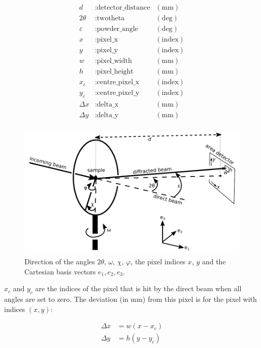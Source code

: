 \documentclass[a4paper, 12pt, twoside]{scrartcl}
\begin{document}
\begin{align*}
	d &: \text{detector\_distance} & (\mathrm{mm})\\
	2\theta &: \text{twotheta} & (\mathrm{deg})\\
	\varepsilon &: \text{powder\_angle} & (\mathrm{deg})\\
	x &: \text{pixel\_x} & (\mathrm{index})\\
	y &: \text{pixel\_y} & (\mathrm{index})\\
	w &: \text{pixel\_width} & (\mathrm{mm})\\
	h &: \text{pixel\_height} & (\mathrm{mm})\\
	x_c &: \text{centre\_pixel\_x} & (\mathrm{index})\\
	y_c &: \text{centre\_pixel\_y} & (\mathrm{index})\\
	\Delta x &: \text{delta\_x} & (\mathrm{mm})\\
	\Delta y &: \text{delta\_y} & (\mathrm{mm})\\
\end{align*}

\begin{figure}
\includegraphics{figs/goniometer.pdf}
\caption{\label{fig:goniometer}Direction of the angles $ 2\theta $, $ \omega $, $ \chi $, $ \varphi $, the pixel indices $ x $, $ y $ and the Cartesian basis vectors $ e_1, e_2, e_3 $.}
\end{figure}

$ x_c $ and $ y_c $ are the indices of the pixel that is hit by the direct beam when all angles are set to zero. The deviation (in mm) from this pixel is for the pixel with indices $ (x, y) $:

\begin{align*}
	\Delta x &= w(x - x_c) \\
	\Delta y &= h(y - y_c) \\
\end{align*}
\end{document}
